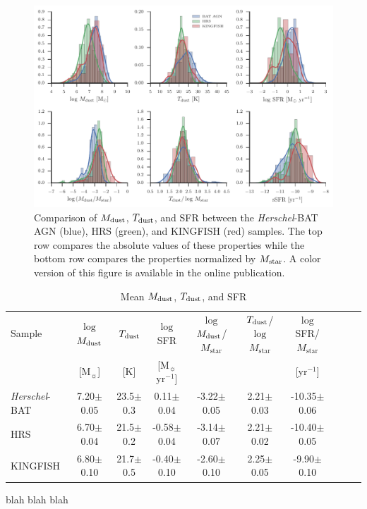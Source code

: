 \documentclass[fleqn, usenatbib]{mnras}
\newcommand{\herschel}{\emph{Herschel}}
\newcommand{\msun}{M$_{\sun}$}
\newcommand{\mstar}{$M_{\mathrm{star}}$}
\newcommand{\mdust}{$M_{\rm dust}$}
\newcommand{\tdust}{$T_{\rm dust}$}
\begin{document}
\begin{figure}
\includegraphics[width=\textwidth]{figures/mdust_tdust_sfr_comparison}
\caption{ Comparison of $M_{\rm dust}$, $T_{\rm dust}$, and SFR between the \herschel-BAT AGN (blue), HRS (green), and KINGFISH (red) samples. The top row compares the absolute values of these properties while the bottom row compares the properties normalized by $M_{\rm star}$. A color version of this figure is available in the online publication. \label{fig:mdust_tdust_sfr_comp}}
\end{figure}

\begin{table}
\centering
\begin{threeparttable}
\captionsetup{font=small,labelfont=bf,labelsep=period}
\caption{Mean \mdust, \tdust, and SFR \label{tab:mean_mdust_tdust_sfr}}
\begin{tabular}{lccccccccc}
\toprule 
Sample & $\log$ \mdust & \tdust & $\log$ SFR & $\log$ \mdust/\mstar & \tdust/$\log$ \mstar & $\log$ SFR/\mstar \\
 & [\msun]  & [K]  &  [\msun{} yr$^{-1}$] &    &   & [yr$^{-1}$]\\
\midrule
\herschel-BAT & 7.20$\pm$0.05 & 23.5$\pm$0.3 & 0.11$\pm$0.04 & -3.22$\pm$0.05 & 2.21$\pm$0.03 & -10.35$\pm$0.06 \\ 
HRS & 6.70$\pm$0.04 & 21.5$\pm$0.2 & -0.58$\pm$0.04 & -3.14$\pm$0.07 & 2.21$\pm$0.02 & -10.40$\pm$0.05 \\
KINGFISH & 6.80$\pm$0.10 & 21.7$\pm$0.5 & -0.40$\pm$0.10 & -2.60$\pm$0.10 & 2.25$\pm$0.05 & -9.90$\pm$0.10 \\
\bottomrule
\end{tabular}
\begin{tablenotes}
\item blah blah blah
\end{tablenotes}
\end{threeparttable}
\end{table}
\end{document}
